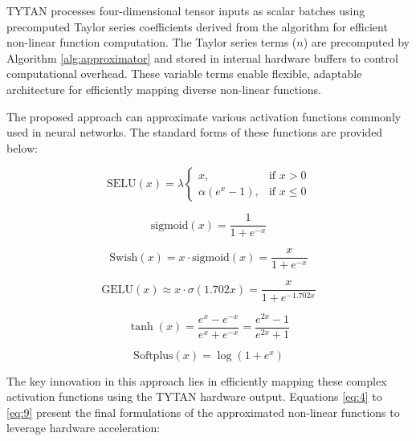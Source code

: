\documentclass[runningheads]{llncs}
\begin{document}
    TYTAN processes four-dimensional tensor inputs as scalar batches using precomputed Taylor series coefficients derived from the algorithm for efficient non-linear function computation. The Taylor series terms ($n$) are precomputed by Algorithm \ref{alg:approximator} and stored in internal hardware buffers to control computational overhead. These variable terms enable flexible, adaptable architecture for efficiently mapping diverse non-linear functions.
    
    The proposed approach can approximate various activation functions commonly used in neural networks. The standard forms of these functions are provided below:
    
    \begin{equation}
        \text{SELU}(x) = \lambda 
        \begin{cases}
            x, & \text{if } x > 0 \\
            \alpha(e^x - 1), & \text{if } x \leq 0
        \end{cases}
    \end{equation}
    
    \begin{equation}
        \text{sigmoid}(x) = \frac{1}{1 + e^{-x}}
    \end{equation}
    
    \begin{equation}
        \text{Swish}(x) = x \cdot \text{sigmoid}(x) = \frac{x}{1 + e^{-x}}
    \end{equation}
    
    \begin{equation}
        \text{GELU}(x) \approx x \cdot \sigma(1.702x) = \frac{x}{1 + e^{-1.702x}}
    \end{equation}
    
    \begin{equation}
        \tanh(x) = \frac{e^x - e^{-x}}{e^x + e^{-x}} = \frac{e^{2x} - 1}{e^{2x} + 1}
    \end{equation}
    
    \begin{equation}
        \text{Softplus}(x) = \log(1 + e^x)
    \end{equation}
    
    The key innovation in this approach lies in efficiently mapping these complex activation functions using the TYTAN hardware output. Equations \ref{eq:4} to \ref{eq:9} present the final formulations of the approximated non-linear functions to leverage hardware acceleration:
    
\end{document}
